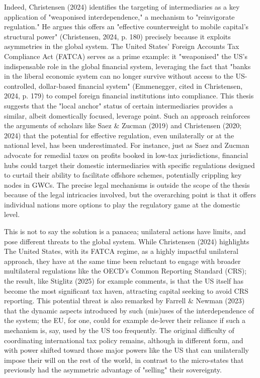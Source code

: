 Indeed, Christensen (2024) identifies the targeting of intermediaries as a key application of "weaponised interdependence," a mechanism to "reinvigorate regulation." He argues this offers an "effective counterweight to mobile capital's structural power" (Christensen, 2024, p. 180) precisely because it exploits asymmetries in the global system. The United States' Foreign Accounts Tax Compliance Act (FATCA) serves as a prime example: it "weaponised" the US's indispensable role in the global financial system, leveraging the fact that "banks in the liberal economic system can no longer survive without access to the US-controlled, dollar-based financial system" (Emmenegger, cited in Christensen, 2024, p. 179) to compel foreign financial institutions into compliance. This thesis suggests that the "local anchor" status of certain intermediaries provides a similar, albeit domestically focused, leverage point. Such an approach reinforces the arguments of scholars like Saez \& Zucman (2019) and Christensen (2020; 2024) that the potential for effective regulation, even unilaterally or at the national level, has been underestimated. For instance, just as Saez and Zucman advocate for remedial taxes on profits booked in low-tax jurisdictions, financial hubs could target their domestic intermediaries with specific regulations designed to curtail their ability to facilitate offshore schemes, potentially crippling key nodes in GWCs. The precise legal mechanisms is outside the scope of the thesis because of the legal intricacies involved, but the overarching point is that it offers individual nations more options to play the regulatory game at the domestic level.

This is not to say the solution is a panacea; unilateral actions have limits, and pose different threats to the global system. While Christensen (2024) highlights The United States, with its FATCA regime, as a highly impactful unilateral approach, they have at the same time been reluctant to engage with broader multilateral regulations like the OECD's Common Reporting Standard (CRS); the result, like Stiglitz (2025) for example comments, is that the US itself has become the most significant tax haven, attracting capital seeking to avoid CRS reporting. This potential threat is also remarked by Farrell \& Newman (2023) that the dynamic aspects introduced by such (mis)uses of the interdependence of the system; the EU, for one, could for example de-lever their reliance if such a mechanism is, say, used by the US too frequently. The original difficulty of coordinating international tax policy remains, although in different form, and with power shifted toward those major powers like the US that can unilaterally impose their will on the rest of the world, in contrast to the micro-states that previously had the asymmetric advantage of "selling" their sovereignty.



